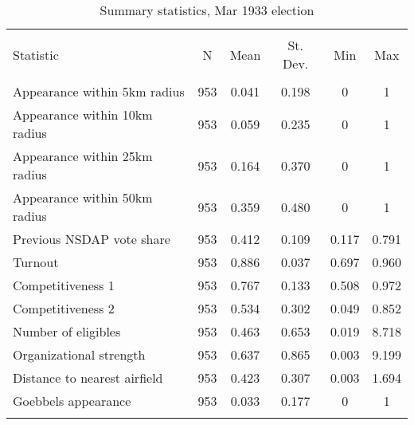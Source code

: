 
\begin{table}[!htbp] \centering 
  \caption{Summary statistics, Mar 1933 election} 
  \label{tab:sumstats1933} 
\begin{tabular}{@{\extracolsep{5pt}}lccccc} 
\\[-1.8ex]\hline \\[-1.8ex] 
Statistic & \multicolumn{1}{c}{N} & \multicolumn{1}{c}{Mean} & \multicolumn{1}{c}{St. Dev.} & \multicolumn{1}{c}{Min} & \multicolumn{1}{c}{Max} \\ 
\hline \\[-1.8ex] 
Appearance within 5km radius & 953 & 0.041 & 0.198 & 0 & 1 \\ 
Appearance within 10km radius & 953 & 0.059 & 0.235 & 0 & 1 \\ 
Appearance within 25km radius & 953 & 0.164 & 0.370 & 0 & 1 \\ 
Appearance within 50km radius & 953 & 0.359 & 0.480 & 0 & 1 \\ 
Previous NSDAP vote share & 953 & 0.412 & 0.109 & 0.117 & 0.791 \\ 
Turnout & 953 & 0.886 & 0.037 & 0.697 & 0.960 \\ 
Competitiveness 1 & 953 & 0.767 & 0.133 & 0.508 & 0.972 \\ 
Competitiveness 2 & 953 & 0.534 & 0.302 & 0.049 & 0.852 \\ 
Number of eligibles & 953 & 0.463 & 0.653 & 0.019 & 8.718 \\ 
Organizational strength & 953 & 0.637 & 0.865 & 0.003 & 9.199 \\ 
Distance to nearest airfield & 953 & 0.423 & 0.307 & 0.003 & 1.694 \\ 
Goebbels appearance & 953 & 0.033 & 0.177 & 0 & 1 \\ 
\hline \\[-1.8ex] 
\end{tabular} 
\end{table} 
